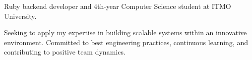 \par{
Ruby backend developer and 4th-year Computer Science student at ITMO University.

Seeking to apply my expertise in building scalable systems within an innovative environment.
Committed to best engineering practices, continuous learning, and contributing to positive team dynamics.
}
\vspace{1em}
